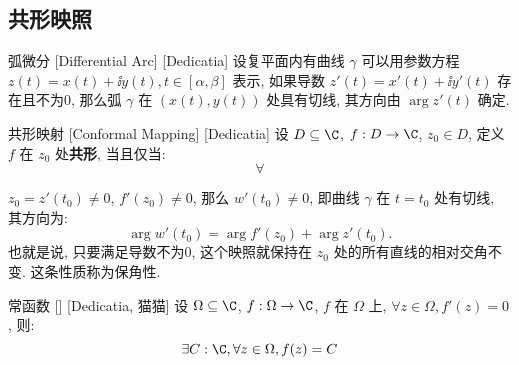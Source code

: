 \documentclass[UTF8]{ctexart}
\newcommand{\hyperrefc}[2]{\hyperref[#1]{\textcolor{purple}{#2}}}
\begin{document}


    \subsection{共形映照}

        \begin{dfn}
            [UUID]
            {弧微分}
            [Differential Arc]
            [Dedicatia]
            设复平面内有曲线 \(\gamma\) 可以用参数方程 \(z(t)=x(t)+\ii y(t), t\in[\alpha,\beta]\) 表示, 如果导数 \(z'(t)=x'(t)+\ii y'(t)\) 存在且不为0, 那么弧 \(\gamma\) 在 \((x(t),y(t))\) 处具有切线, 其方向由 \(\arg z'(t)\) 确定. 
        \end{dfn}

        \begin{dfn}
            {共形映射}
            [Conformal Mapping]
            [Dedicatia]
            设 \(D\subseteq\C\), \(f:D\to\C\), \(z_0\in D\), 定义 \(f\) 在 \(z_0\) 处\textbf{共形}, 当且仅当: 
            \[\forall \]
            
            \(z_0=z'(t_0)\neq 0\),  \(f'(z_0)\neq 0\), 那么 \(w'(t_0)\neq 0\), 即曲线 \(\gamma\) 在 \(t=t_0\) 处有切线, 其方向为: 
            \[\arg w'(t_0)=\arg f'(z_0)+\arg z'(t_0).\]
            也就是说, 只要满足导数不为0, 这个映照就保持在 \(z_0\) 处的所有直线的相对交角不变. 这条性质称为保角性. 
        \end{dfn}

        \begin{ppt}
            [TrivialAnalyticalFunction]
            {常函数}
            []
            [Dedicatia, 猫猫]
            设 \(\Omega\subseteq\C\), \(f:\Omega\to\C\), \(f\) 在 \(\Omega\) 上, \(\forall z\in\Omega, f'(z)=0\), 则: 
            \[\exists C:\C, \forall z\in\Omega, f(z)=C\]
        \end{ppt}
\end{document}
